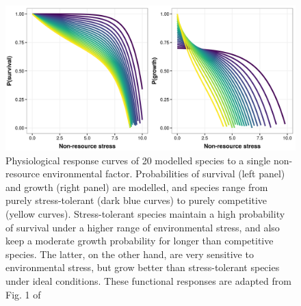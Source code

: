 \begin{figure}[!ht]
\centering
\includegraphics[width=\textwidth]{./Figures/Appendix6_1/Fig_2.png}
\caption[Response curves]{\color{Gray} Physiological response curves of 20 modelled species to a single non-resource environmental factor. Probabilities of survival (left panel) and growth (right panel) are modelled, and species range from purely stress-tolerant (dark blue curves) to purely competitive (yellow curves). Stress-tolerant species maintain a high probability of survival under a higher range of environmental stress, and also keep a moderate growth probability for longer than competitive species. The latter, on the other hand, are very sensitive to environmental stress, but grow better than stress-tolerant species under ideal conditions. These functional responses are adapted from Fig. 1 of \cite{Maestre2009}}
\label{fig:figApp6.1.2}
\end{figure}

